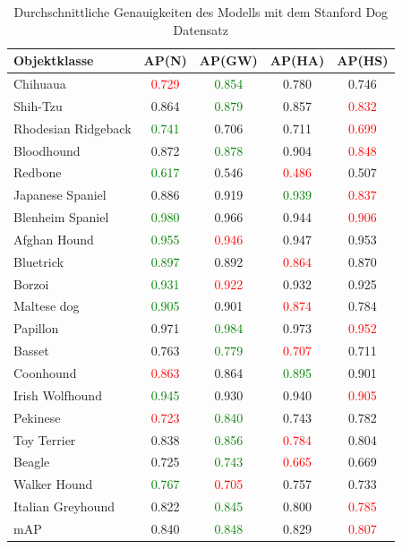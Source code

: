 \begin{table}
[h]
\caption{Durchschnittliche Genauigkeiten des Modells mit dem Stanford Dog Datensatz}
\centering
\begin{tabular}{|l|c|c|c|c|}
\hline
Objektklasse & AP(N) & AP(GW) & AP(HA) & AP(HS)\\
\hline
Chihuaua & \textcolor{red}{0.729} & \textcolor{green}{0.854} & 0.780 & 0.746\\ 
Shih-Tzu & 0.864 & \textcolor{green}{0.879} & 0.857 & \textcolor{red}{0.832}\\
Rhodesian Ridgeback & \textcolor{green}{0.741} & 0.706 & 0.711 & \textcolor{red}{0.699}\\
Bloodhound & 0.872 & \textcolor{green}{0.878} & 0.904 & \textcolor{red}{0.848}\\
Redbone & \textcolor{green}{0.617} & 0.546 & \textcolor{red}{0.486} & 0.507\\ 
Japanese Spaniel & 0.886 & 0.919 & \textcolor{green}{0.939} & \textcolor{red}{0.837}\\
Blenheim Spaniel & \textcolor{green}{0.980} & 0.966 & 0.944 & \textcolor{red}{0.906}\\
Afghan Hound & \textcolor{green}{0.955} & \textcolor{red}{0.946} & 0.947 & 0.953\\
Bluetrick & \textcolor{green}{0.897} & 0.892 & \textcolor{red}{0.864} & 0.870\\ 
Borzoi & \textcolor{green}{0.931} & \textcolor{red}{0.922} & 0.932 & 0.925\\
Maltese dog & \textcolor{green}{0.905} & 0.901 & \textcolor{red}{0.874} & 0.784\\
Papillon & 0.971 & \textcolor{green}{0.984} & 0.973 & \textcolor{red}{0.952}\\
Basset & 0.763 & \textcolor{green}{0.779} & \textcolor{red}{0.707} & 0.711\\
Coonhound & \textcolor{red}{0.863} & 0.864 & \textcolor{green}{0.895} & 0.901\\
Irish Wolfhound & \textcolor{green}{0.945} & 0.930 & 0.940 & \textcolor{red}{0.905}\\
Pekinese & \textcolor{red}{0.723} & \textcolor{green}{0.840} & 0.743 & 0.782\\
Toy Terrier & 0.838 & \textcolor{green}{0.856} & \textcolor{red}{0.784} & 0.804\\
Beagle & 0.725 & \textcolor{green}{0.743} & \textcolor{red}{0.665} & 0.669\\
Walker Hound & \textcolor{green}{0.767} & \textcolor{red}{0.705} & 0.757 & 0.733\\
Italian Greyhound & 0.822 & \textcolor{green}{0.845} & 0.800 & \textcolor{red}{0.785}\\
\hline
mAP & 0.840 & \textcolor{green}{0.848} & 0.829 & \textcolor{red}{0.807}\\
\hline
\end{tabular}
\end{table}
